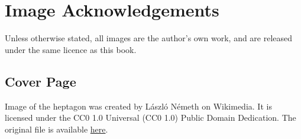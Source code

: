 \chapter{Image Acknowledgements}
Unless otherwise stated, all images are the author's own work, and are released under the same licence as this book.

\section{Cover Page}
Image of the heptagon was created by L\'{a}szl\'{o} N\'{e}meth on Wikimedia. It is licensed under the CC0 1.0 Universal (CC0 1.0) Public Domain Dedication. The original file is available \href{https://commons.wikimedia.org/wiki/File:Regular_polygon_7_annotated.svg}{here}.

\printbibliography[heading=bibintoc, title={References and Bibliography}]



